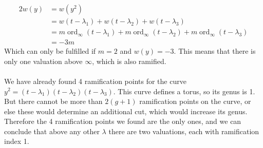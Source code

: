 \documentclass[12 pt]{article}
\DeclareMathOperator{\ord}{ord}
\begin{document}
\begin{align*}
   2 w(y) &=  w(y^2) \\
  &= w(t - \lambda_1) + w (t - \lambda_2) + w(t - \lambda_3)     \\
 &= m\ord_{\infty} (t - \lambda_1) + m\ord_{\infty} (t - \lambda_2) + m\ord_{\infty} (t - \lambda_3) \\
 &= -3m
\end{align*}
Which can only be fulfilled if $m=2$ and $w(y) = -3$. This means that there is only one valuation above $\infty$, which is also ramified.
\\
\\
We have already found 4 ramification points for the curve $y^2 = (t-\lambda_1)(t-\lambda_2)(t-\lambda_3)$. This curve defines a torus, so its genus is 1. But there cannot be more than $2(g+1)$ ramification points on the curve, or else these would determine an additional cut, which would increase its genus. Therefore the 4 ramification points we found are the only ones, and we can conclude that above any other $\lambda$ there are two valuations, each with ramification index 1. 
\end{document}

